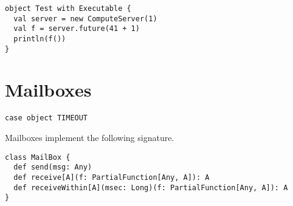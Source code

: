 

\begin{lstlisting}
object Test with Executable {
  val server = new ComputeServer(1)
  val f = server.future(41 + 1)
  println(f())
}
\end{lstlisting}

\section{Mailboxes}
\label{sec:mailbox}

\begin{lstlisting}
case object TIMEOUT
\end{lstlisting}
Mailboxes implement the following signature.
\begin{lstlisting}
class MailBox {
  def send(msg: Any)
  def receive[A](f: PartialFunction[Any, A]): A
  def receiveWithin[A](msec: Long)(f: PartialFunction[Any, A]): A
}
\end{lstlisting}

